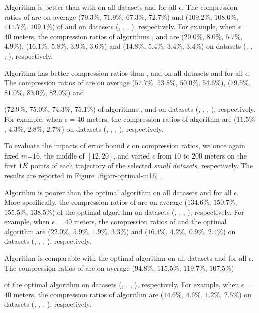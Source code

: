 { Algorithm \cist is better than  with \dps on all datasets and for all $\epsilon$.
The compression ratios of \cist are on average {($79.3\%$, $71.9\%$, $67.3\%$, $72.7\%$) and ($109.2\%$, $108.0\%$, $111.7\%$, $109.1\%$)} of \squishe and
\dps on {datasets (\sercar, \geolife, \mopsi, \pricar)}, respectively.
For example, when $\epsilon$ = $40$ meters, the compression ratios of algorithms
\squishe, \cist and \dps are
{($20.0\%$, $8.0\%$, $5.7\%$, $4.9\%$), ($16.1\%$, $5.8\%$, $3.9\%$, $3.6\%$) and ($14.8\%$, $5.4\%$, $3.4\%$, $3.4\%$)} on  {datasets (\sercar, \geolife, \mopsi, \pricar)}, respectively.

 Algorithm \cista has better compression ratios than \dpa, \squishe and \cist on all datasets and for all $\epsilon$.
The compression ratios of \cista are on average ($57.7\%$, $53.8\%$, $50.0\%$, $54.6\%$), ($79.5\%$, $81.0\%$, $83.0\%$, $82.0\%$) and {($72.9\%$, $75.0\%$, $74.3\%$, $75.1\%$) of algorithms
\squishe, \dps and \cist on {datasets (\sercar, \geolife, \mopsi, \pricar)}, respectively.
For example, when $\epsilon$ = $40$ meters, the compression ratios of algorithm
\cista are ($11.5\%$, $4.3\%$, $2.8\%$, $2.7\%$) on datasets (\sercar, \geolife, \mopsi, \pricar), respectively.

To evaluate the impacts of error bound $\epsilon$ on compression ratios, we once again fixed {$m$=$16$}, the middle of $[12, 20]$, and varied $\epsilon$ from $10$ to $200$ meters on the first $1K$ points of each trajectory of the selected \textit{small datasets}, respectively.
The results are reported in Figure~\ref{fig:cr-optimal-m16} .

 Algorithm \cist is poorer than the optimal algorithm on all datasets and for all $\epsilon$.
More specifically, the compression ratios of \cist are on average ($134.6\%$, $150.7\%$, $155.5\%$, $138.5\%$) of the optimal algorithm on {datasets (\sercar, \geolife, \mopsi, \pricar)}, respectively.
For example, when $\epsilon$ = $40$ meters, the compression ratios of \cist and the optimal algorithm are
($22.0\%$, $5.9\%$, $1.9\%$, $3.3\%$) and {($16.4\%$, $4.2\%$, $0.9\%$, $2.4\%$)}
on  {datasets (\sercar, \geolife, \mopsi, \pricar)}, respectively.

 Algorithm \cista is comparable with the optimal algorithm on all datasets and for all $\epsilon$.
The compression ratios of \cista are on average  ($94.8\%$, $115.5\%$, $119.7\%$, $107.5\%$)} of the optimal algorithm
 on {datasets (\sercar, \geolife, \mopsi, \pricar)}, respectively.
For example, when $\epsilon$ = $40$ meters, the compression ratios of algorithm
\cista are ($14.6\%$, $4.6\%$, $1.2\%$, $2.5\%$) on datasets (\sercar, \geolife, \mopsi, \pricar), respectively.

}
